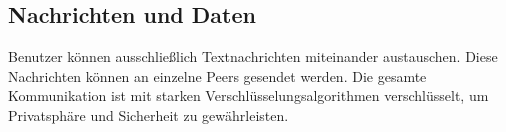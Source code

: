 \subsection{Nachrichten und Daten}

Benutzer können ausschließlich Textnachrichten miteinander austauschen. 
Diese Nachrichten können an einzelne Peers gesendet werden.
Die gesamte Kommunikation ist mit starken Verschlüsselungsalgorithmen 
verschlüsselt, um Privatsphäre und Sicherheit zu gewährleisten.